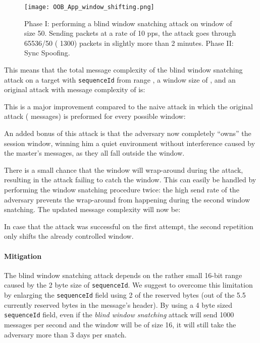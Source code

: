 \documentclass[11pt]{article}
\begin{document}
\begin{figure}[t]

\centerline{\texttt{[image: OOB\_App\_window\_shifting.png]}}

\caption{Phase I: performing a blind window snatching attack on window of size 50. Sending packets at a rate of 10 pps, the attack goes through 65536/50 ( 1300) packets in slightly more than 2 minutes. Phase II: Sync Spoofing.}

\label{Win shift fig}

\end{figure}



This means that the total message complexity of the blind window snatching attack on a target with \texttt{sequenceId} from range , a window size of , and an original attack with message complexity of  is: 



This is a major improvement compared to the naive attack in which the original attack ( messages) is preformed for every possible window:



An added bonus of this attack is that the adversary now completely ``owns'' the session window, winning him a quiet environment without interference caused by the master's messages, as they all fall outside the window.

There is a small chance that the window will wrap-around during the attack, resulting in the attack failing to catch the window. This can easily be handled by performing the window snatching procedure twice: the high send rate of the adversary prevents the wrap-around from happening during the second window snatching. The updated message complexity will now be:



In case that the attack was successful on the first attempt, the second repetition only shifts the already controlled window.

\paragraph{Mitigation}\label{time:scenrio4:mit}

The blind window snatching attack depends on the rather small 16-bit range  caused by the 2 byte size of \texttt{sequenceId}. We suggest to overcome this limitation by enlarging the \texttt{sequenceId} field using 2 of the reserved bytes (out of the 5.5 currently reserved bytes in the message's header). By using a 4 byte sized \texttt{sequenceId} field, even if the \emph{blind window snatching} attack will send 1000 messages per second and the window will be of size 16, it will still take the adversary more than 3 days per snatch.
\end{document}
